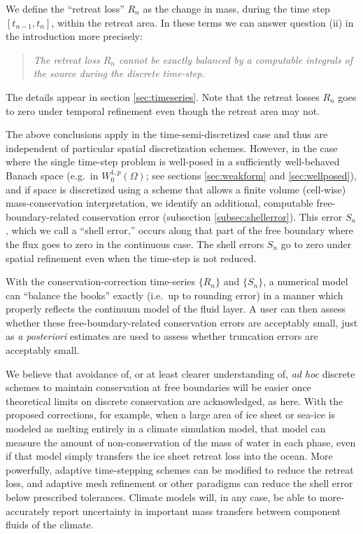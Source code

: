 \documentclass[final,leqno,onefignum,onetabnum]{siamltex1213bueler}
\begin{document}
We define the ``retreat loss'' $R_n$ as the change in mass, during the time step $[t_{n-1},t_n]$, within the retreat area.  In these terms we can answer question (ii) in the introduction more precisely:
\begin{quote}
  \emph{The retreat loss $R_n$ cannot be exactly balanced by a computable integrals of the source during the discrete time-step.}
\end{quote}
The details appear in section \ref{sec:timeseries}.  Note that the retreat losses $R_n$ goes to zero under temporal refinement even though the retreat area may not.

The above conclusions apply in the time-semi-discretized case and thus are independent of particular spatial discretization schemes.  However, in the case where the single time-step problem is well-posed in a sufficiently well-behaved Banach space (e.g.~in $W_0^{1,p}(\Omega)$; see sections \ref{sec:weakform} and \ref{sec:wellposed}), and if space is discretized using a scheme that allows a finite volume (cell-wise) mass-conservation interpretation, we identify an additional, computable free-boundary-related conservation error (subsection \ref{subsec:shellerror}).  This error $S_n$, which we call a ``shell error,'' occurs along that part of the free boundary where the flux goes to zero in the continuous case.  The shell errors $S_n$ go to zero under spatial refinement even when the time-step is not reduced.

With the conservation-correction time-series $\{R_n\}$ and $\{S_n\}$, a numerical model can ``balance the books'' exactly (i.e.~up to rounding error) in a manner which properly reflects the continuum model of the fluid layer.  A user can then assess whether these free-boundary-related conservation errors are acceptably small, just as \emph{a posteriori} estimates are used to assess whether truncation errors are acceptably small.

We believe that avoidance of, or at least clearer understanding of, \emph{ad hoc} discrete schemes to maintain conservation at free boundaries will be easier once theoretical limits on discrete conservation are acknowledged, as here.  With the proposed corrections, for example, when a large area of ice sheet or sea-ice is modeled as melting entirely in a climate simulation model, that model can measure the amount of non-conservation of the mass of water in each phase, even if that model simply transfers the ice sheet retreat loss into the ocean.  More powerfully, adaptive time-stepping schemes can be modified to reduce the retreat loss, and adaptive mesh refinement or other paradigms can reduce the shell error below prescribed tolerances.  Climate models will, in any case, be able to more-accurately report uncertainty in important mass transfers between component fluids of the climate.
\end{document}

